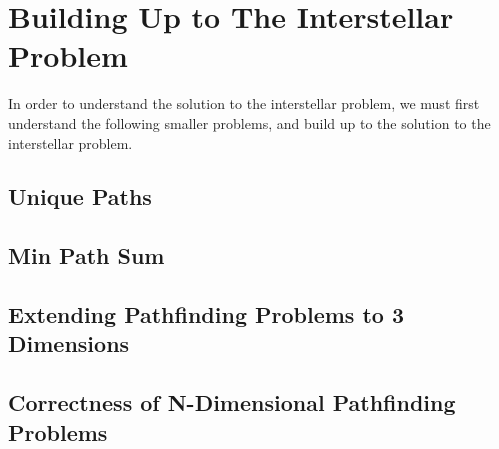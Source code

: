 \section{Building Up to The Interstellar Problem}
In order to understand the solution to the interstellar problem, we must first understand the following smaller problems,
and build up to the solution to the interstellar problem.

\subsection{Unique Paths}


\subsection{Min Path Sum}


\subsection{Extending Pathfinding Problems to 3 Dimensions}


\subsection{Correctness of N-Dimensional Pathfinding Problems}
